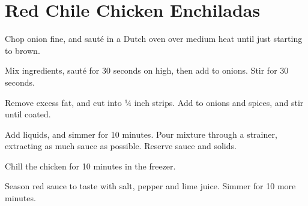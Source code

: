 

\section{Red Chile Chicken Enchiladas}
\begin{recipe}


Chop onion fine, and sauté in a Dutch oven over medium heat until just starting to brown.


Mix ingredients, sauté for 30 seconds on high, then add to onions. Stir for 30 seconds.


Remove excess fat, and cut into ¼ inch strips. Add to onions and spices, and stir until coated.


Add liquids, and simmer for 10 minutes. Pour mixture through a strainer, extracting as much sauce as possible. Reserve sauce and solids.

Chill the chicken for 10 minutes in the freezer.

Season red sauce to taste with salt, pepper and lime juice. Simmer for 10 more minutes.



\end{recipe}
